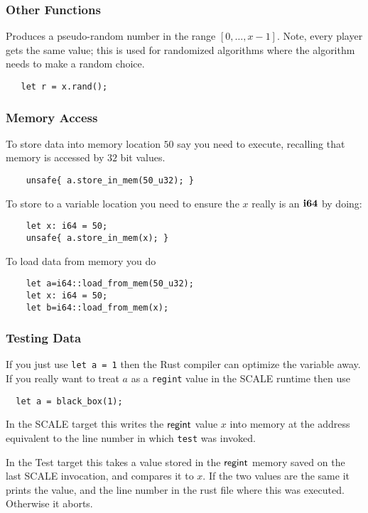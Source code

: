 \subsubsection{Other Functions}

Produces a pseudo-random number in the range $[0,\ldots,x-1]$.
Note, every player gets the same value; this is used for randomized
algorithms where the algorithm needs to make a random choice.
\begin{lstlisting}
   let r = x.rand();
\end{lstlisting}


\subsubsection{Memory Access}
To store data into memory location $50$ say you need to execute,
recalling that memory is accessed by $32$ bit values.
\begin{lstlisting}
    unsafe{ a.store_in_mem(50_u32); }
\end{lstlisting}
To store to a variable location you need to ensure the $x$ really
is an $\mathbf{i64}$ by doing:
\begin{lstlisting}
    let x: i64 = 50;
    unsafe{ a.store_in_mem(x); }
\end{lstlisting}

To load data from memory you do
\begin{lstlisting}
    let a=i64::load_from_mem(50_u32);
    let x: i64 = 50;
    let b=i64::load_from_mem(x);
\end{lstlisting}


\subsubsection{Testing Data}

If you just use \verb|let a = 1| then the Rust compiler can optimize
the variable away. If you really want to treat $a$ as a \verb|regint|
value in the SCALE runtime then use
\begin{lstlisting}
  let a = black_box(1);
\end{lstlisting}


In the SCALE target this writes the $\mathsf{regint}$ value $x$
into memory at the address equivalent to the line number in
which \verb|test| was invoked.

In the Test target this takes a value stored in the $\mathsf{regint}$
memory saved on the last SCALE invocation, and compares it to
$x$. If the two values are the same it prints the value, and the
line number in the rust file where this was executed.
Otherwise it aborts.

